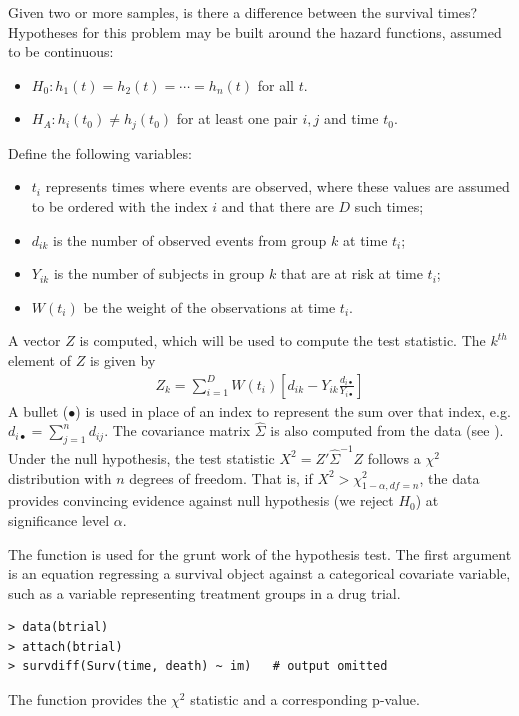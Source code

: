 \documentclass[article]{jss}
\begin{document}
Given two or more samples, is there a difference between the survival times? Hypotheses for this problem may be built around the hazard functions, assumed to be continuous:
\begin{itemize}
\item $H_0: h_1(t) = h_2(t) = \cdots = h_n(t)$ for all $t$.
\item $H_A: h_i(t_0)\neq h_j(t_0)$ for at least one pair $i,j$ and time $t_0$.
\end{itemize}
Define the following variables:
\begin{itemize}
\item $t_{i}$ represents times where events are observed, where these values are assumed to be ordered with the index $i$ and that there are $D$ such times;
\item $d_{ik}$ is the number of observed events from group $k$ at time $t_i$;
\item $Y_{ik}$ is the number of subjects in group $k$ that are at risk at time $t_i$;
\item $W(t_i)$ be the weight of the observations at time $t_i$.
\end{itemize}
A vector $Z$ is computed, which will be used to compute the test statistic. The $k^{th}$ element of $Z$ is given by
\begin{eqnarray*}
Z_k = \sum_{i=1}^D W(t_i)\left[d_{ik} - Y_{ik}\frac{d_{i\bullet}}{Y_{i\bullet}}\right]
\end{eqnarray*}
A bullet ($\bullet$) is used in place of an index to represent the sum over that index, e.g. $d_{i\bullet} = \sum_{j=1}^{n} d_{ij}$. The covariance matrix $\widehat{\Sigma}$ is also computed from the data (see \citet{Klein2003}). Under the null hypothesis, the test statistic $X^2 = Z'\hat{\Sigma}^{-1}Z$ follows a $\chi^2$ distribution with $n$ degrees of freedom. That is, if $X^2 > \chi^2_{1-\alpha, df=n}$, the data provides convincing evidence against null hypothesis (we reject $H_0$) at significance level $\alpha$.

The  function is used for the grunt work of the hypothesis test. The first argument is an equation regressing a survival object against a categorical covariate variable, such as a variable representing treatment groups in a drug trial.
\begin{verbatim}
> data(btrial)
> attach(btrial)
> survdiff(Surv(time, death) ~ im)   # output omitted
\end{verbatim}
The  function provides the $\chi^2$ statistic and a corresponding p-value.
\end{document}
